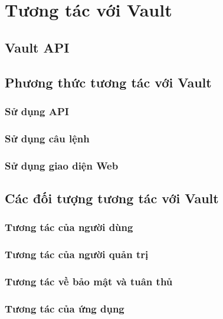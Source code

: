 \documentclass[12pt,a4paper]{report}
\begin{document}
	\section{Tương tác với Vault}
	\subsection{Vault API}
	\subsection{Phương thức tương tác với Vault}
	\subsubsection{Sử dụng API}
	\subsubsection{Sử dụng câu lệnh}
	\subsubsection{Sử dụng giao diện Web}
	\subsection{Các đối tượng tương tác với Vault}
	\subsubsection{Tương tác của người dùng}
	\subsubsection{Tương tác của người quản trị}
	\subsubsection{Tương tác về bảo mật và tuân thủ}
	\subsubsection{Tương tác của ứng dụng}
\end{document}
